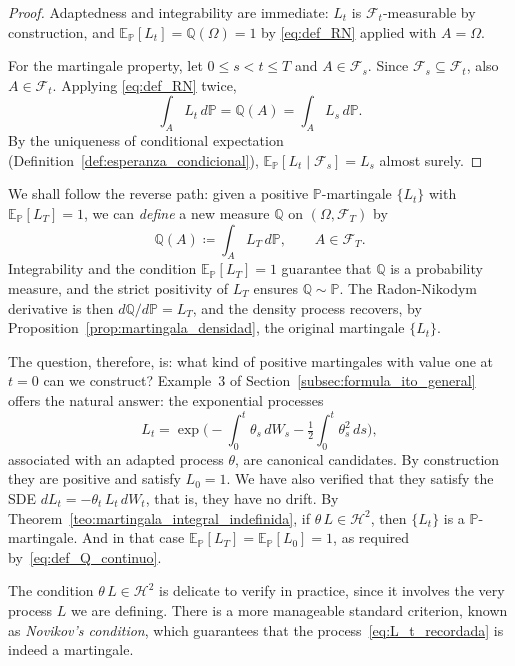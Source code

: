 \documentclass[11pt,a4paper,oneside]{report}
\theoremstyle{plain}
\theoremstyle{definition}
\theoremstyle{remark}
\newcommand{\E}{\mathbb{E}}
\newcommand{\PP}{\mathbb{P}}
\newcommand{\Q}{\mathbb{Q}}
\newcommand{\F}{\mathcal{F}}
\newcommand{\1}{\mathbf{1}}
\newcommand{\eqdef}{\coloneqq}
\begin{document}
\begin{proof}
Adaptedness and integrability are immediate: $L_t$ is
$\F_t$-measurable by construction, and $\E_\PP[L_t] = \Q(\Omega) = 1$
by \eqref{eq:def_RN} applied with $A = \Omega$.

For the martingale property, let $0 \leq s < t \leq T$ and
$A \in \F_s$. Since $\F_s \subseteq \F_t$, also $A \in \F_t$.
Applying \eqref{eq:def_RN} twice,
\begin{equation*}
  \int_A L_t\, d\PP = \Q(A) = \int_A L_s\, d\PP.
\end{equation*}
By the uniqueness of conditional expectation
(Definition~\ref{def:esperanza_condicional}),
$\E_\PP[L_t \mid \F_s] = L_s$ almost surely.
\end{proof}

We shall follow the reverse path: given a positive
$\PP$-martingale $\{L_t\}$ with $\E_\PP[L_T] = 1$, we can
\emph{define} a new measure $\Q$ on $(\Omega, \F_T)$ by
\begin{equation}\label{eq:def_Q_continuo}
  \Q(A) \eqdef \int_A L_T\, d\PP, \qquad A \in \F_T.
\end{equation}
Integrability and the condition $\E_\PP[L_T] = 1$ guarantee that $\Q$
is a probability measure, and the strict positivity of $L_T$ ensures
$\Q \sim \PP$. The Radon-Nikodym derivative is then
$d\Q/d\PP = L_T$, and the density process recovers, by
Proposition~\ref{prop:martingala_densidad}, the original martingale
$\{L_t\}$.

The question, therefore, is: what kind of positive martingales with
value one at $t = 0$ can we construct? Example~3 of
Section~\ref{subsec:formula_ito_general} offers the natural answer:
the exponential processes
\begin{equation}\label{eq:L_t_recordada}
  L_t = \exp\!\biggl(-\int_0^t \theta_s\, dW_s
                      - \tfrac{1}{2} \int_0^t \theta_s^2\, ds\biggr),
\end{equation}
associated with an adapted process $\theta$, are canonical
candidates. By construction they are positive and satisfy $L_0 = 1$.
We have also verified that they satisfy the SDE
$dL_t = -\theta_t\, L_t\, dW_t$, that is, they have no drift. By
Theorem~\ref{teo:martingala_integral_indefinida}, if
$\theta\, L \in \mathcal{H}^2$, then $\{L_t\}$ is a $\PP$-martingale.
And in that case $\E_\PP[L_T] = \E_\PP[L_0] = 1$, as required
by~\eqref{eq:def_Q_continuo}.

The condition
$\theta\, L \in \mathcal{H}^2$ is delicate to verify in practice,
since it involves the very process $L$ we are defining. There is a
more manageable standard criterion, known as \emph{Novikov's
condition}, which guarantees that the
process~\eqref{eq:L_t_recordada} is indeed a martingale.
\end{document}
